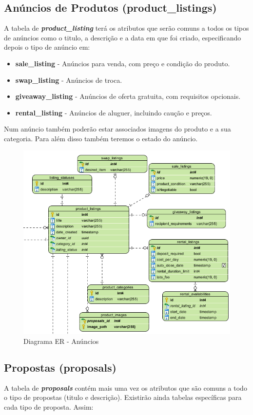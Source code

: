 \documentclass[a4paper, 12pt]{article} %
\begin{document}
\subsection{\textbf{Anúncios de Produtos (product\_listings)}}

A tabela de \textbf{\textit{product\_listing}} terá os atributos que serão comuns a todos os tipos de anúncios como o titulo, a descrição e a data em que foi criado, especificando depois o tipo de anúncio em:

\begin{itemize}
	\item \textbf{sale\_listing} - Anúncios para venda, com preço e condição do produto.
	\item \textbf{swap\_listing} - Anúncios de troca.
	\item \textbf{giveaway\_listing} - Anúncios de oferta gratuita, com requisitos opcionais.
	\item \textbf{rental\_listing} - Anúncios de aluguer, incluindo caução e preços.
\end{itemize}
Num anúncio também poderão estar associados imagens do produto e a sua categoria. Para além disso também teremos o estado do anúncio.
\begin{figure}[H]
	\centering
	\includegraphics[width=\textwidth, height=10cm]{../images/entity-relationship-diagram-listings.png}
	\caption{Diagrama ER - Anúncios}
	\label{fig:ER Listings}
\end{figure}

\newpage

\subsection{\textbf{Propostas (proposals)}}
A tabela de \textbf{\textit{proposals}} contém mais uma vez os atributos que são comuns a todo o tipo de propostas (titulo e descrição). Existirão ainda tabelas específicas para cada tipo de proposta. Assim:
\end{document}
